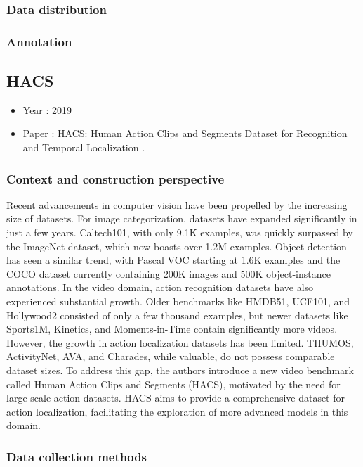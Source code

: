 \documentclass[10pt,onecolumn,letterpaper]{article}
\begin{document}
\subsubsection{Data distribution}
\subsubsection{Annotation}

\subsection{HACS}

\begin{itemize}
	\item Year : 2019
	\item Paper : HACS: Human Action Clips and Segments Dataset for Recognition and Temporal Localization \cite{HACS}.
\end{itemize}

\subsubsection{Context and construction perspective}

Recent advancements in computer vision have been propelled by the increasing size of datasets. For image categorization, datasets have expanded significantly in just a few years. Caltech101, with only 9.1K examples, was quickly surpassed by the ImageNet dataset, which now boasts over 1.2M examples. Object detection has seen a similar trend, with Pascal VOC starting at 1.6K examples and the COCO dataset currently containing 200K images and 500K object-instance annotations. In the video domain, action recognition datasets have also experienced substantial growth. Older benchmarks like HMDB51, UCF101, and Hollywood2 consisted of only a few thousand examples, but newer datasets like Sports1M, Kinetics, and Moments-in-Time contain significantly more videos. However, the growth in action localization datasets has been limited. THUMOS, ActivityNet, AVA, and Charades, while valuable, do not possess comparable dataset sizes. To address this gap, the authors introduce a new video benchmark called Human Action Clips and Segments (HACS), motivated by the need for large-scale action datasets. HACS aims to provide a comprehensive dataset for action localization, facilitating the exploration of more advanced models in this domain.
\subsubsection{Data collection methods}
\end{document}
